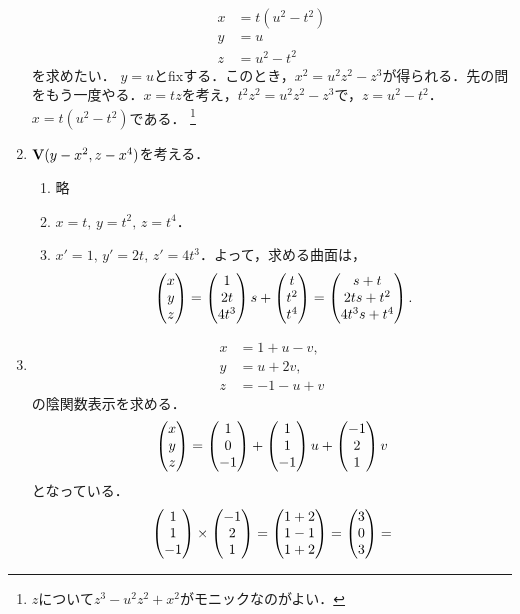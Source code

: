 \documentclass[9pt]{ltjsarticle}
\begin{document}
\begin{enumerate}[label=(問題\arabic*)]
\begin{align}
 x &= t(u^2-t^2)\\
 y& = u\\
 z& = u^2-t^2
\end{align}
を求めたい．
$y=u$とfixする．このとき，$x^2=u^2z^2 -z^3$が得られる．先の問をもう一度やる．$x=tz$を考え，$t^2z^2=u^2z^2-z^3$で，$z=u^2-t^2$．$x=t(u^2-t^2)$である．
\footnote{$z$について$z^3-u^2z^2+x^2$がモニックなのがよい．}
 \item $\textbf V(y-x^2,z-x^4)$を考える．
\begin{enumerate}[label=(\alph*)]
 \item 略
 \item $x=t,\, y=t^2,\, z=t^4$．
 \item $x'=1,\, y'=2t,\, z'=4t^3$．よって，求める曲面は，
\begin{align}
 \left(\begin{matrix} x\\ y\\ z \end{matrix}\right) = \left(\begin{matrix} 1 \\ 2t \\ 4t^3 \end{matrix}\right)s + \left(\begin{matrix} t \\ t^2 \\ t^4 \end{matrix}\right)
=
\left(\begin{matrix} s + t \\ 2ts + t^2 \\ 4t^3 s + t^4 \end{matrix}\right).
\end{align}
\end{enumerate}
 \item
\begin{align}
 x & = 1 + u-v,\\
 y& = u+2v,\\
 z& = -1-u+v
\end{align}
の陰関数表示を求める．
\begin{align}
 \left(\begin{matrix} x \\ y \\ z \end{matrix}\right) =
\left(\begin{matrix} 1 \\ 0 \\ -1 \end{matrix}\right)
+
\left(\begin{matrix} 1 \\ 1 \\ -1 \end{matrix}\right)u
+
\left(\begin{matrix} -1 \\ 2 \\ 1 \end{matrix}\right)v
\end{align}
となっている．
\begin{align}
 \tatev{1 \\ 1 \\ -1}\times \tatev{-1 \\ 2 \\ 1} =
\tatev{1 + 2 \\ 1 - 1 \\ 1 + 2} =
\tatev{3 \\ 0 \\ 3} =

\end{align}
\end{enumerate}
\end{document}
